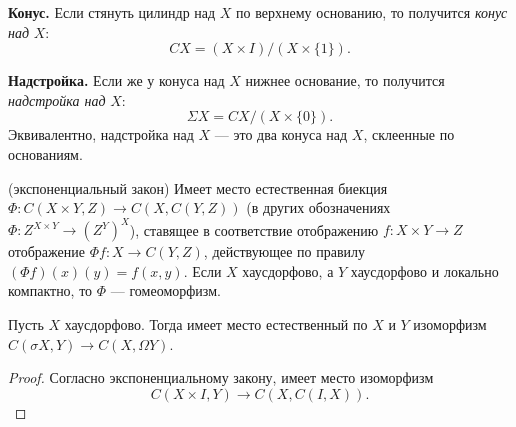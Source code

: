 \textbf{Конус.} Если стянуть цилиндр над $X$ по верхнему основанию, то получится \textit{конус над} $X$:
	\begin{equation*}
		CX=(X\times I)/(X\times\{1\}).
	\end{equation*}

\textbf{Надстройка.} Если же у конуса над $X$ нижнее основание, то получится \textit{надстройка над} $X$:
	\begin{equation*}
		\Sigma X=CX/(X\times\{0\}).
	\end{equation*}
Эквивалентно, надстройка над $X$ --- это два конуса над $X$, склеенные по основаниям.

\begin{prop}(экспоненциальный закон)
	Имеет место естественная биекция $\Phi\colon C(X\times Y, Z)\to C(X,C(Y,Z))$ (в других обозначениях $\Phi\colon Z^{X\times Y}\to (Z^Y)^X$), ставящее в соответствие отображению $f\colon X\times Y\to Z$ отображение $\Phi f\colon X\to C(Y,Z)$, действующее по правилу $(\Phi f)(x)(y)=f(x,y)$. Если $X$ хаусдорфово, а $Y$ хаусдорфово и локально компактно, то $\Phi$ --- гомеоморфизм.
\end{prop}
\begin{prop}
	Пусть $X$ хаусдорфово. Тогда имеет место естественный по $X$ и $Y$ изоморфизм $C(\sigma X, Y)\to C(X,\Omega Y)$. 
\end{prop}
\begin{proof}
	Согласно экспоненциальному закону, имеет место изоморфизм
		\begin{equation*}
			C(X\times I,Y)\to C(X, C(I,X)).
		\end{equation*}
\end{proof}